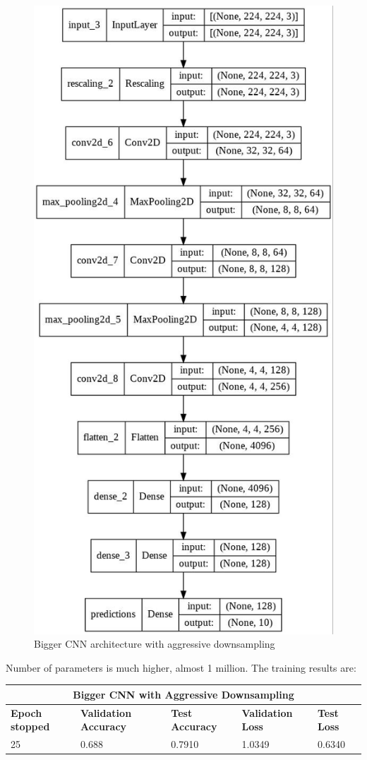\begin{figure}[H]
	\centering
	\includegraphics[height=1.0\textwidth]{img/scratch/bigger_aggressive_downsampling.jpg}
	\caption{Bigger CNN architecture with aggressive downsampling}
	\label{fig:BiggerAggressiveDownsamplingCNN}
\end{figure}

\noindent Number of parameters is much higher, almost 1 million. The training results are: 

\medskip

\begin{tabular}{ |p{2cm}|p{2cm}|p{2cm}|p{2cm}|p{2cm}|  }
\hline
\multicolumn{5}{|c|}{Bigger CNN with Aggressive Downsampling} \\
\hline
\textbf{Epoch stopped} & \textbf{Validation Accuracy} & \textbf{Test Accuracy} & \textbf{Validation Loss} & \textbf{Test Loss} \\
\hline
25 & 0.688 & 0.7910 & 1.0349 & 0.6340\\
\hline
\end{tabular}

\medskip



